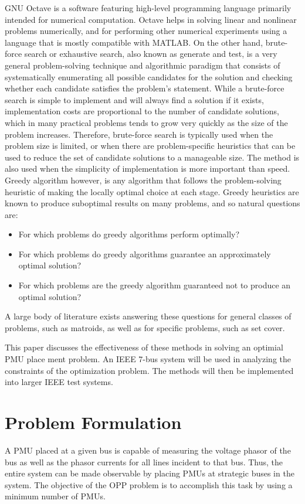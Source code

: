 \documentclass[conference]{IEEEtran}
\begin{document}
GNU Octave is a software featuring high-level programming language primarily intended for numerical computation. Octave helps in solving linear and nonlinear problems numerically, and for performing other numerical experiments using a language that is mostly compatible with MATLAB. On the other hand, brute-force search or exhaustive search, also known as generate and test, is a very general problem-solving technique and algorithmic paradigm that consists of systematically enumerating all possible candidates for the solution and checking whether each candidate satisfies the problem's statement. While a brute-force search is simple to implement and will always find a solution if it exists, implementation costs are proportional to the number of candidate solutions, which in many practical problems tends to grow very quickly as the size of the problem increases\cite{EmilyFox}. Therefore, brute-force search is typically used when the problem size is limited, or when there are problem-specific heuristics that can be used to reduce the set of candidate solutions to a manageable size. The method is also used when the simplicity of implementation is more important than speed. Greedy algorithm however, is any algorithm that follows the problem-solving heuristic of making the locally optimal choice at each stage. Greedy heuristics are known to produce suboptimal results on many problems, \cite{Feige1998} and so natural questions are:
\begin{itemize}
	\item For which problems do greedy algorithms perform optimally?
	\item For which problems do greedy algorithms guarantee an approximately optimal solution?
	\item For which problems are the greedy algorithm guaranteed not to produce an optimal solution?
\end{itemize}
A large body of literature exists answering these questions for general classes of problems, such as matroids\cite{Nishimura2009}, as well as for specific problems\cite{Chvatal1979}, such as set cover.

This paper discusses the effectiveness of these methods in solving an optimial PMU place ment problem. An IEEE 7-bus system will be used in analyzing the constraints of the optimization problem. The methods will then be implemented into larger IEEE test systems.

\section{Problem Formulation}
A PMU placed at a given bus is capable of measuring the voltage phasor of the bus as well as the phasor currents for all lines incident to that bus. Thus, the entire system can be made observable by placing PMUs at strategic buses in the system. The objective of the OPP problem is to
accomplish this task by using a minimum number of PMUs.
\end{document}
